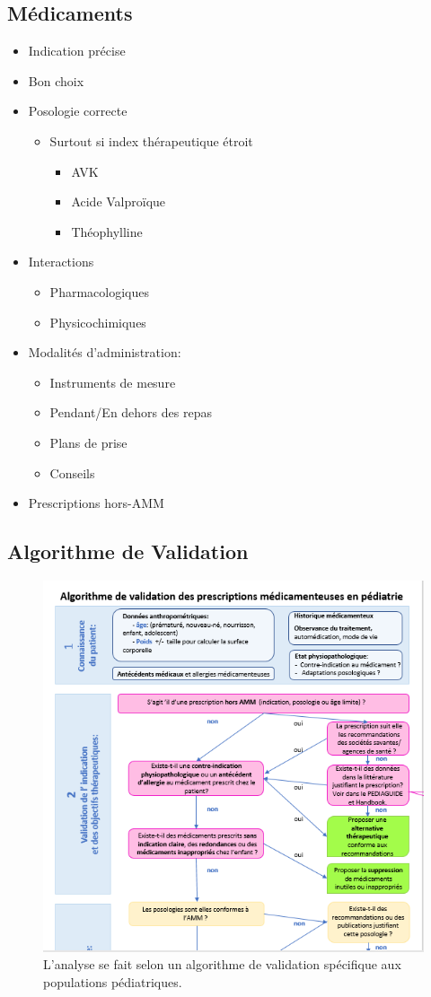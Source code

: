 \documentclass[11pt]{article}
\begin{document}
\subsection{Médicaments}
\label{sec:orgfad8f2a}
\begin{itemize}
\item Indication précise
\item Bon choix
\item Posologie correcte
\begin{itemize}
\item Surtout si index thérapeutique étroit
\begin{itemize}
\item AVK
\item Acide Valproïque
\item Théophylline
\end{itemize}
\end{itemize}
\item Interactions
\begin{itemize}
\item Pharmacologiques
\item Physicochimiques
\end{itemize}
\item Modalités d'administration:
\begin{itemize}
\item Instruments de mesure
\item Pendant/En dehors des repas
\item Plans de prise
\item Conseils
\end{itemize}
\item Prescriptions hors-AMM
\end{itemize}
\subsection{Algorithme de Validation}
\label{sec:org5d5dcce}
\begin{figure}[htbp]
\centering
\includegraphics[width=.9\linewidth]{./pedia_validation2.png}
\caption{L'analyse se fait selon un algorithme de validation spécifique aux populations pédiatriques.}
\end{figure}
\end{document}
